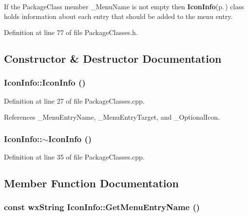 If the Package\-Class member \_\-Menu\-Name is not empty then {\bf Icon\-Info}{\rm (p.\,\pageref{class_icon_info})} class holds information about each entry that should be added to the menu entry. 



Definition at line 77 of file Package\-Classes.h.

\subsection{Constructor \& Destructor Documentation}
\subsubsection{\setlength{\rightskip}{0pt plus 5cm}Icon\-Info::Icon\-Info ()}\label{class_icon_info_f3f5a7e15597ca3ac22e5634a5795961}




Definition at line 27 of file Package\-Classes.cpp.

References \_\-Menu\-Entry\-Name, \_\-Menu\-Entry\-Target, and \_\-Optional\-Icon.
\subsubsection{\setlength{\rightskip}{0pt plus 5cm}Icon\-Info::$\sim$Icon\-Info ()}\label{class_icon_info_bdcf54fb5011fd9ac1f60869525fecff}




Definition at line 35 of file Package\-Classes.cpp.

\subsection{Member Function Documentation}
\subsubsection{\setlength{\rightskip}{0pt plus 5cm}const wx\-String Icon\-Info::Get\-Menu\-Entry\-Name ()\hspace{0.3cm}{\tt  [inline]}}\label{class_icon_info_1ece7137a413e6e55b06553b1c7b07ff}





